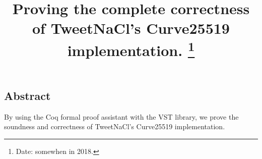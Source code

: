 \documentclass[letterpaper,twocolumn,10pt]{article}
\newif\ifpublic
\begin{document}
\date{}

\title{\Large \bf Proving the complete correctness of TweetNaCl's Curve25519 implementation.%
\thanks{
Date: somewhen in 2018.}
}

\ifpublic
\author{
{\rm Peter Schwabe}\\
  Radboud University, The Netherlands\\
\and
{\rm Beno\^it Viguier}\\
  Radboud University, The Netherlands\\
\and
{\rm Timmy Weerwag}\\
  Radboud University, The Netherlands\\
\and
{\rm Freek Wiedijk}\\
  Radboud University, The Netherlands\\
}
\fi

\maketitle


\subsection*{Abstract}
By using the Coq formal proof assistant with the VST library, we prove the
soundness and correctness of TweetNaCl's Curve25519 implementation.








\vspace*{1cm}
{\footnotesize 
}

\begin{appendix}
\end{appendix}
\end{document}
